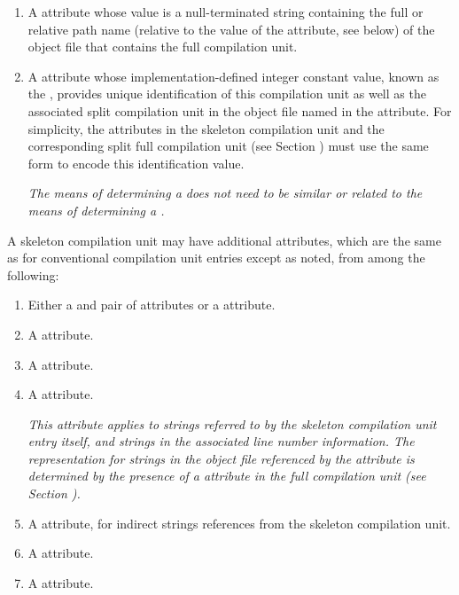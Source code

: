 \begin{enumerate}[1. ]

\item {}
A \DWATdwonameDEFN{} attribute
whose value is a
null-terminated string containing the full or relative
path name (relative to the value of the \DWATcompdir{} attribute, 
see below) of the object file that contains the full
compilation unit.

\item {}
A \DWATdwoidDEFN{} attribute
whose implementation-defined integer constant value,
known as the \CUsignature,
provides unique identification of this compilation unit
as well as the associated split compilation unit in the
object file named in the \DWATdwoname{}
attribute. For simplicity, the \DWATdwoidNAME{} attributes
in the skeleton compilation unit and the corresponding
split full compilation unit 
(see Section )
must use the same form to encode this identification value.

\textit{The means of determining a \CUsignature{} does not 
need to be similar or related to the means of determining a
\TUsignature.}

\end{enumerate}

A skeleton compilation unit may have additional attributes, 
which are the same as for conventional compilation unit entries 
except as noted, from among the following:
\begin{enumerate}[1. ]
\addtocounter{enumi}{2}
\item Either a \DWATlowpc{} and \DWAThighpc{} pair of attributes
or a \DWATranges{} attribute.
\item A \DWATstmtlist{} attribute.
\item A \DWATcompdir{} attribute.

\item A \DWATuseUTFeight{} attribute.

\textit{This attribute applies to strings referred to by the skeleton
compilation unit entry itself, and strings in the associated line
number information.
The representation for strings in the object file referenced 
by the \DWATdwoname{} attribute is determined by the presence 
of a \DWATuseUTFeight{} attribute in the full compilation unit 
(see Section ).}

\item A \DWATstroffsetsbase{} attribute, for indirect strings references 
from the skeleton compilation unit.
\item A \DWATaddrbase{} attribute.
\item A \DWATrangesbase{} attribute.

\end{enumerate}

